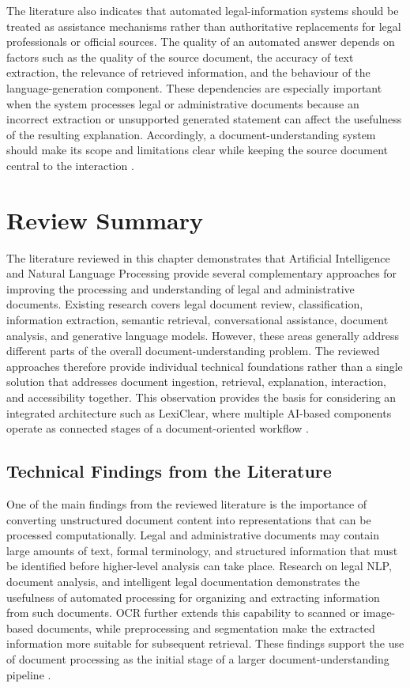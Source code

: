 \documentclass[12pt,a4paper,oneside]{report}
\begin{document}
The literature also indicates that automated legal-information systems should
be treated as assistance mechanisms rather than authoritative replacements
for legal professionals or official sources. The quality of an automated
answer depends on factors such as the quality of the source document, the
accuracy of text extraction, the relevance of retrieved information, and the
behaviour of the language-generation component. These dependencies are
especially important when the system processes legal or administrative
documents because an incorrect extraction or unsupported generated statement
can affect the usefulness of the resulting explanation. Accordingly, a
document-understanding system should make its scope and limitations clear
while keeping the source document central to the interaction
\cite{lewis2020rag,es2024ragas}.

\section{Review Summary}

The literature reviewed in this chapter demonstrates that Artificial
Intelligence and Natural Language Processing provide several complementary
approaches for improving the processing and understanding of legal and
administrative documents. Existing research covers legal document review,
classification, information extraction, semantic retrieval, conversational
assistance, document analysis, and generative language models. However, these
areas generally address different parts of the overall document-understanding
problem. The reviewed approaches therefore provide individual technical
foundations rather than a single solution that addresses document ingestion,
retrieval, explanation, interaction, and accessibility together. This
observation provides the basis for considering an integrated architecture
such as LexiClear, where multiple AI-based components operate as connected
stages of a document-oriented workflow
\cite{mahoney2019,kandula2023,jurisai2025}.

\subsection{Technical Findings from the Literature}

One of the main findings from the reviewed literature is the importance of
converting unstructured document content into representations that can be
processed computationally. Legal and administrative documents may contain
large amounts of text, formal terminology, and structured information that
must be identified before higher-level analysis can take place. Research on
legal NLP, document analysis, and intelligent legal documentation demonstrates
the usefulness of automated processing for organizing and extracting
information from such documents. OCR further extends this capability to
scanned or image-based documents, while preprocessing and segmentation make
the extracted information more suitable for subsequent retrieval. These
findings support the use of document processing as the initial stage of a
larger document-understanding pipeline
\cite{bommarito2018lexnlp,pramanik2025}.
\end{document}
